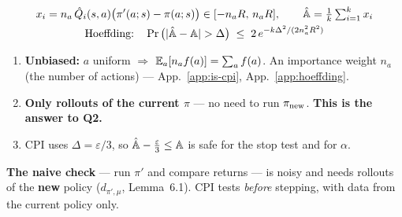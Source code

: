 \begin{eqbox}
\begin{gather*}
  x_i = n_a\,\hat Q_i(s,a)\big(\pi'(a;s)-\pi(a;s)\big)\in[-n_aR,\,n_aR], \qquad \hat\PA=\tfrac1k\textstyle\sum_{i=1}^k x_i\\
  \text{Hoeffding:}\quad \Pr\big(|\hat\PA-\PA|>\Delta\big) \;\le\; 2\,e^{-k\Delta^2/(2n_a^2R^2)}
\end{gather*}
\end{eqbox}

\begin{enumerate}
  \item \textbf{Unbiased:} $a$ uniform $\Rightarrow$ $\mathbb{E}_a[n_af(a)]=\sum_af(a)$. An importance weight $n_a$ (the number of actions) --- App.~\ref{app:is-cpi}, App.~\ref{app:hoeffding}.
  \item \textbf{Only rollouts of the current $\pi$} --- no need to run $\pi_{\mathrm{new}}$. \textbf{This is the answer to Q2.}
  \item CPI uses $\Delta=\varepsilon/3$, so $\hat{\mathbb{A}}-\frac\varepsilon3\le\mathbb{A}$ is safe for the stop test and for $\alpha$.
\end{enumerate}

\begin{center}
\end{center}

\begin{notebox}
\textbf{The naive check} --- run $\pi'$ and compare returns --- is noisy and needs rollouts of the \textbf{new} policy ($d_{\pi',\mu}$, Lemma~6.1). CPI tests \emph{before} stepping, with data from the current policy only.
\end{notebox}

